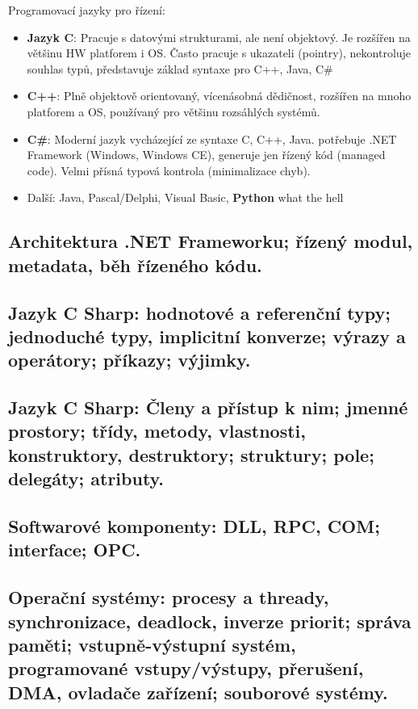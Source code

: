 Programovací jazyky pro řízení:
\begin{itemize}
\item \textbf{Jazyk C}: Pracuje s datovými strukturami, ale není objektový. Je rozšířen na většinu HW platforem i OS. Často pracuje s ukazateli (pointry), nekontroluje souhlas typů, představuje základ syntaxe pro C++, Java, C\#
\item \textbf{C++}: Plně objektově orientovaný, vícenásobná dědičnost, rozšířen na mnoho platforem a OS, používaný pro většinu rozsáhlých systémů.
\item \textbf{C\#}: Moderní jazyk vycházející ze syntaxe C, C++, Java. potřebuje .NET Framework (Windows, Windows CE), generuje jen řízený kód (managed code). Velmi přísná typová kontrola (minimalizace chyb).
\item Další: Java, Pascal/Delphi, Visual Basic, \textbf{Python} what the hell
\end{itemize}

\subsection{Architektura .NET Frameworku; řízený modul, metadata, běh řízeného kódu.}

\subsection{Jazyk C Sharp: hodnotové a referenční typy; jednoduché typy, implicitní konverze; výrazy a operátory; příkazy; výjimky.}

\subsection{Jazyk C Sharp: Členy a přístup k nim; jmenné prostory; třídy, metody, vlastnosti, konstruktory, destruktory; struktury; pole; delegáty; atributy.}

\subsection{Softwarové komponenty: DLL, RPC, COM; interface; OPC.}

\subsection{Operační systémy: procesy a thready, synchronizace, deadlock, inverze priorit; správa paměti; vstupně-výstupní systém, programované vstupy/výstupy, přerušení, DMA, ovladače zařízení; souborové systémy.}

